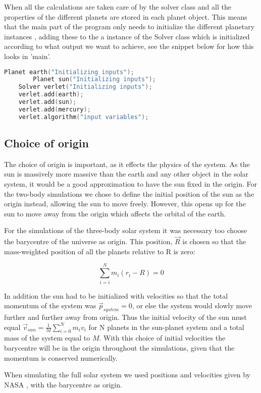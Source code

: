 When all the calculations are taken care of by the solver class and all the properties of the different planets are stored in each planet object. This means that the main part of the program only needs to initialize the different planetary instances , adding these to the a instance of the Solver class which is initialized according to what output we want to achieve, see the snippet below for how this looks in 'main'. 
 
\begin{lstlisting}[language=C++]
	Planet earth("Initializing inputs");
		Planet sun("Initializing inputs");
	Solver verlet("Initializing inputs");
	verlet.add(earth);
	verlet.add(sun);
	verlet.add(mercury);
	verlet.algorithm("input variables");
\end{lstlisting}



\subsection{Choice of origin}

The choice of origin is important, as it effects the physics of the system. As the sun is massively more massive than the earth and any other object in the solar system, it would be a good approximation to have the sun fixed in the origin. For the two-body simulations we chose to define the initial position of the sun as the origin instead, allowing the sun to move freely. However, this opens up for the sun to move away from the origin which affects the orbital of the earth. 

For the simulations of the three-body solar system it was necessary too choose the barycentre of the universe as origin. This position, $ \vec{R} $ is chosen so that the mass-weighted position of all the planets relative to R is zero:

\begin{equation}
	\sum\limits_{i=i}^{N} m_i(r_i-R) = 0 \label{eq:barycentre}
\end{equation}

In addition the sun had to be initialized with velocities so that the total momentum of the system was $\vec{p}_{system}= 0 $, or else the system would slowly move further and further away from origin. Thus the initial velocity of the sun must equal $ \vec{v}_{sun} = \frac{1}{M} \sum\limits_{i=0}^{N} m_iv_i $ for N planets in the sun-planet system and a total mass of the system equal to $ M $. With this choice of initial velocities the barycentre will be in the origin throughout the simulations, given that the momentum is conserved numerically. 

When simulating the full solar system we used positions and velocities given by NASA \cite{nasa}, with the barycentre as origin. 
